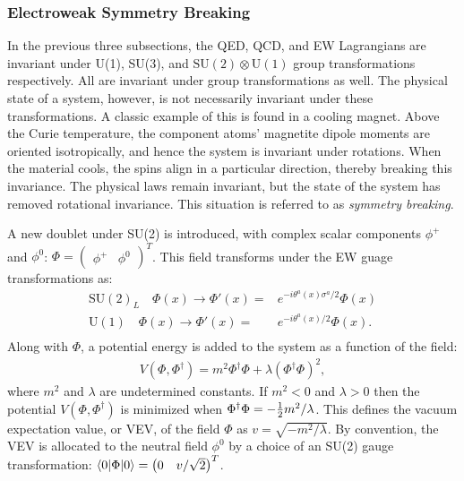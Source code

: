 \subsubsection{Electroweak Symmetry Breaking}\label{sec:higgsMechanism}

In the previous three subsections, the QED, QCD, and EW Lagrangians are invariant under U(1), SU(3), and $\text{SU}(2)\otimes\text{U}(1)$ group transformations respectively.
All are invariant under \poincare group transformations as well.
The physical state of a system, however, is not necessarily invariant under these transformations.
A classic example of this is found in a cooling magnet.
Above the Curie temperature, the component atoms' magnetite dipole moments are oriented isotropically, and hence the system is invariant under rotations.
When the material cools, the spins align in a particular direction, thereby breaking this invariance.
The physical laws remain invariant, but the state of the system has removed rotational invariance.
This situation is referred to as \emph{symmetry breaking}.

A new doublet under SU(2) is introduced, with complex scalar components $\phi^+$ and $\phi^0$: $\Phi=\begin{pmatrix}\phi^+&\phi^0\end{pmatrix}^T$.
This field transforms under the EW guage transformations as:
\begin{equation}\begin{split}\label{eqn:scalarTransform}
    \text{SU}(2)_L\quad\Phi(x)\to\Phi'(x)=&e^{-i\theta^a(x)\sigma^a/2}\Phi(x) \\
    \text{U}(1)\quad\Phi(x)\to\Phi'(x)=&e^{-i\theta^a(x)/2}\Phi(x). \\
\end{split}\end{equation}
Along with $\Phi$, a potential energy is added to the system as a function of the field:
\begin{equation}\begin{split}
V(\Phi,\Phi^\dagger)=m^2\Phi^\dagger\Phi+\lambda(\Phi^\dagger\Phi)^2,
\end{split}\end{equation}
where $m^2$ and $\lambda$ are undetermined constants.
If $m^2<0$ and $\lambda>0$ then the potential $V(\Phi,\Phi^\dagger)$ is minimized when $\Phi^\dagger\Phi=-\frac{1}{2} m^2/\lambda$.
This defines the vacuum expectation value, or VEV, of the field $\Phi$ as $v=\sqrt{-m^2/\lambda}$.
By convention, the VEV is allocated to the neutral field $\phi^0$ by a choice of an SU(2) gauge transformation: $\braket{0|\Phi|0}=\begin{pmatrix}0&v/\sqrt{2}\end{pmatrix}^T$.

